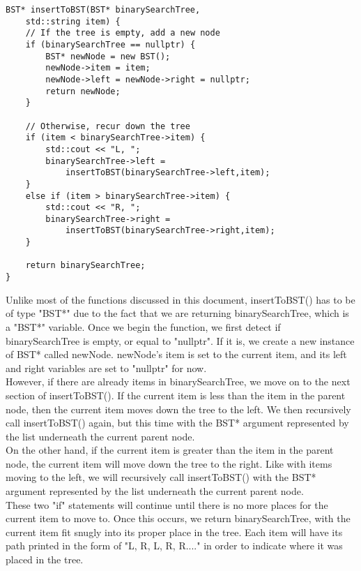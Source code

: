 \documentclass{article}
\begin{document}
\begin{lstlisting}
BST* insertToBST(BST* binarySearchTree, 
    std::string item) {
    // If the tree is empty, add a new node
    if (binarySearchTree == nullptr) {
        BST* newNode = new BST();
        newNode->item = item;
        newNode->left = newNode->right = nullptr;
        return newNode;
    }

    // Otherwise, recur down the tree
    if (item < binarySearchTree->item) {
        std::cout << "L, ";
        binarySearchTree->left = 
            insertToBST(binarySearchTree->left,item);
    }
    else if (item > binarySearchTree->item) {
        std::cout << "R, ";
        binarySearchTree->right = 
            insertToBST(binarySearchTree->right,item);
    }

    return binarySearchTree;
}
\end{lstlisting}
Unlike most of the functions discussed in this document, insertToBST() has to be of type "BST*" due to the fact that we are returning binarySearchTree, which is a "BST*" variable. Once we begin the function, we first detect if binarySearchTree is empty, or equal to "nullptr". If it is, we create a new instance of BST* called newNode. newNode's item is set to the current item, and its left and right variables are set to "nullptr" for now. \\
However, if there are already items in binarySearchTree, we move on to the next section of insertToBST(). If the current item is less than the item in the parent node, then the current item moves down the tree to the left. We then recursively call insertToBST() again, but this time with the BST* argument represented by the list underneath the current parent node. \\
On the other hand, if the current item is greater than the item in the parent node, the current item will move down the tree to the right. Like with items moving to the left, we will recursively call insertToBST() with the BST* argument represented by the list underneath the current parent node. \\
These two "if" statements will continue until there is no more places for the current item to move to. Once this occurs, we return binarySearchTree, with the current item fit snugly into its proper place in the tree. Each item will have its path printed in the form of "L, R, L, R, R...." in order to indicate where it was placed in the tree. 

\pagebreak
\end{document}
